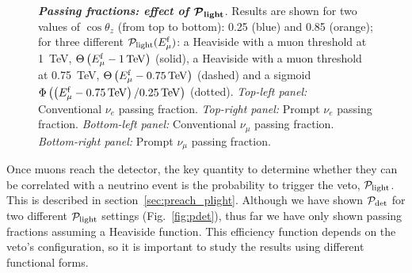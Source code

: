 \documentclass[aps,prd,showpacs,letterpaper,onecolumn,longbibliography,superscriptaddress,notitlepage,nofootinbib]{revtex4-1}%
\newcommand{\Emf}{E_{\mu}^{\rm f}}
\newcommand{\Prob}{{\cal P}}
\begin{document}
\begin{figure}[h!]
{    }    
\caption{\textbf{\textit{Passing fractions: effect of $\boldsymbol{\Prob_{\rm light}}$}}. Results are shown for two values of $\cos\theta_z$ (from top to bottom): 0.25 (blue) and 0.85 (orange); for three different $\Prob_{\rm light}(\Emf)$: a Heaviside with a muon threshold at 1~TeV, $\Theta\left(\Emf - 1 \, {\rm TeV}\right)$ (solid), a Heaviside with a muon threshold at 0.75~TeV, $\Theta\left(\Emf - 0.75 \, {\rm TeV}\right)$ (dashed) and a sigmoid $\Phi\left(\left(\Emf - 0.75 \, {\rm TeV}\right)/0.25 \, {\rm TeV}\right)$ (dotted). \textit{Top-left panel:} Conventional $\nu_e$ passing fraction. \textit{Top-right panel:} Prompt $\nu_e$ passing fraction. \textit{Bottom-left panel:} Conventional $\nu_\mu$ passing fraction. \textit{Bottom-right panel:} Prompt $\nu_\mu$ passing fraction.} \vspace{1.5cm}
\label{fig:nue-plight-effect}
\end{figure}

Once muons reach the detector, the key quantity to determine whether they can be correlated with a neutrino event is the probability to trigger the veto, $\Prob_{\rm light}$. This is described in section~\ref{sec:preach_plight}. Although we have shown $\Prob_{\rm det}$ for two different $\Prob_{\rm light}$ settings (Fig.~\ref{fig:pdet}), thus far we have only shown passing fractions assuming a Heaviside function. This efficiency function depends on the veto's configuration, so it is important to study the results using different functional forms.
\end{document}
